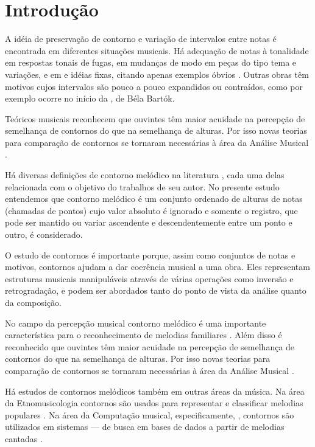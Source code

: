 \chapter{Introdução}
\label{cha:introducao}

A idéia de preservação de contorno e variação de intervalos entre
notas é encontrada em diferentes situações musicais. Há adequação de
notas à tonalidade em respostas tonais de fugas, em mudanças de modo
em peças do tipo tema e variações, e em  e idéias
fixas, citando apenas exemplos óbvios
\cite[p. 29]{morris87:composition}. Outras obras têm motivos cujos
intervalos são pouco a pouco expandidos ou contraídos, como por
exemplo ocorre no início da , de Béla Bartók.

Teóricos musicais reconhecem que ouvintes têm maior acuidade na
percepção de semelhança de contornos do que na semelhança de
alturas. Por isso novas teorias para comparação de contornos se
tornaram necessárias à área da Análise Musical
\cite[p. 226]{marvin.ea87:relating}.

Há diversas definições de contorno melódico na literatura
\cite{piston59:harmony,toch77:shaping,schonberg:fundamentals,adams76:melodic,marvin.ea87:relating,morris87:composition,clifford95:contour,beard03:contour},
cada uma delas relacionada com o objetivo do trabalhos de seu
autor. No presente estudo entendemos que contorno melódico é um
conjunto ordenado de alturas de notas (chamadas de pontos) cujo valor
absoluto é ignorado e somente o registro, que pode ser mantido ou
variar ascendente e descendentemente entre um ponto e outro, é
considerado.

O estudo de contornos é importante porque, assim como conjuntos de
notas e motivos, contornos ajudam a dar coerência musical a uma
obra. Eles representam estruturas musicais manipuláveis através de
várias operações como inversão e retrogradação, e podem ser abordados
tanto do ponto de vista da análise quanto da composição.

No campo da percepção musical contorno melódico é uma importante
característica para o reconhecimento de melodias familiares \cite[p.
136]{dowling.ea86:music}. Além disso é reconhecido que ouvintes têm
maior acuidade na percepção de semelhança de contornos do que na
semelhança de alturas. Por isso novas teorias para comparação de
contornos se tornaram necessárias à área da Análise Musical
\cite[p. 226]{marvin.ea87:relating}.

Há estudos de contornos melódicos também em outras áreas da música. Na
área da Etnomusicologia contornos são usados para representar e
classificar melodias populares \cite{adams76:melodic}. Na área da
Computação musical, especificamente, , contornos são utilizados em sistemas  --- de busca em bases de dados a partir de melodias
cantadas \cite{ghias.ea95:query}.

